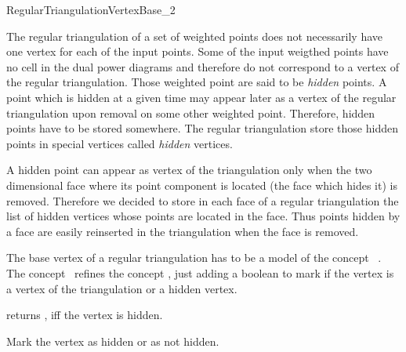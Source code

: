 

\begin{ccRefConcept}{RegularTriangulationVertexBase_2}


\ccDefinition
  
The regular triangulation of a set of weighted points does not
necessarily
have one vertex for each of the input points. Some of the input
weigthed points have no cell in the dual power diagrams
and therefore do not correspond to a vertex of the regular
triangulation.
Those weighted point are said to be {\it hidden} points.
A  point which is hidden at a given time may appear later as a vertex of
the regular triangulation upon removal on some other weighted point.
Therefore, hidden points have to be stored somewhere.
The regular triangulation store those hidden points
in special vertices called {\it hidden} vertices.

A hidden point can appear as vertex of the triangulation
only when the
two dimensional face where its point component is located
(the face which hides it)
is removed. Therefore we decided to store 
in each  face of a regular triangulation
the list of hidden vertices whose points are located in the face.
Thus  points hidden by a face are easily reinserted in the triangulation
when the face is removed.

The base vertex of a regular triangulation has to be a model
of the concept \ccRefName\ .
The concept \ccRefName\ refines the concept 
 ,
just adding a boolean to mark if the vertex is a 
vertex of the triangulation or a hidden vertex.

\ccRefines




{returns , iff the vertex is hidden.}

{Mark the vertex as hidden or as not hidden.}


\ccHasModels
{}

\ccSeeAlso
{}

\end{ccRefConcept}


